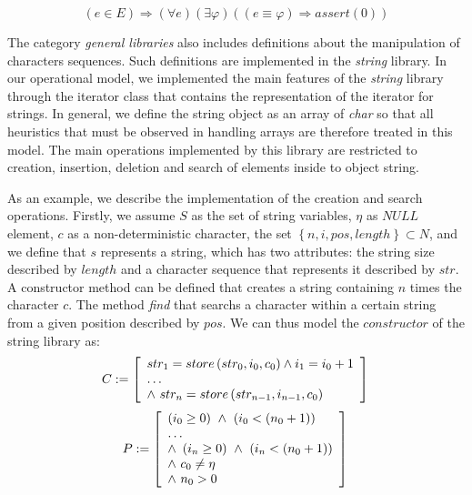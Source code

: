 \documentclass[a4paper]{llncs}
\begin{document}
\begin{equation}
\label{stdexcept}
\left( e \in E \right) 
\Rightarrow \left(\forall e\right)\left(\exists\varphi\right)\left(\left(e\equiv\varphi\right) 
\Rightarrow assert\left(0\right)\right)
\end{equation}

The category \textit{general libraries} also includes definitions 
about the manipulation of characters sequences. Such definitions 
are implemented in the \textit{string} library. In our operational 
model, we implemented the main features of the \textit{string}
library through the iterator class that contains the 
representation of the iterator for strings. In general, 
we define the string object as an array of \textit{char} so that all 
heuristics that must be observed in handling arrays are therefore 
treated in this model. The main operations implemented by this library 
are restricted to creation, insertion, deletion and search of elements 
inside to object string. 

As an example, we describe the implementation of the creation and search 
operations. Firstly, we assume $S$ as the set of string variables, 
$\eta$ as $NULL$ element, $c$ as a non-deterministic character, 
the set $\left\{n, i, pos, length\right\} \subset N$, 
and we define that $s$ represents a string, which has two attributes: 
the string size described by $length$ and a character sequence that 
represents it described by $str$. A constructor method can be defined 
that creates a string containing $n$ times the character $c$. The method 
\textit{find} that searchs a character within a certain string from a 
given position described by $pos$. We can thus model the $constructor$ 
of the string library as:
%
\begin{equation}
\label{cconstructor-string}
C := \left [ \begin{array}{ll} 
                str_{1} = store\left(str_{0}, i_{0}, c_{0}\right) \wedge i_{1} = i_{0} + 1  \\
		\ldots \\
		\wedge \, \, str_{n} = store\left(str_{n-1}, i_{n-1}, c_{0}\right)
              \end{array} \right ]  \\ 
\end{equation}
%
\begin{equation}
\label{pconstructor-string}
P := \left [ \begin{array}{ll} 
                \left(i_{0} \geq 0\right)  \, \, \wedge \, \, \left(i_{0} < \left(n_{0} + 1\right)\right)\\
                \ldots \\
                \wedge \, \, \left(i_{n} \geq 0\right)  \, \, \wedge \, \, \left(i_{n} < \left(n_{0} + 1\right)\right)\\
                \wedge \, \, c_{0} \neq \eta\\
                \wedge \, \, n_{0} > 0\\
              \end{array} \right ]  \\ 
\end{equation}
\end{document}
